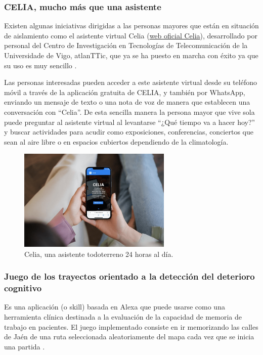 \subsubsection{CELIA, mucho más que una asistente}

Existen algunas iniciativas dirigidas a las personas mayores que están en situación de aislamiento como el asistente virtual Celia (\href{https://celiatecuida.com/}{web oficial Celia}), desarrollado por personal del Centro de Investigación en Tecnologías de Telecomunicación de la Universidade de Vigo, atlanTTic, que ya se ha puesto en marcha con éxito ya que su uso es muy sencillo \parencite{celia-app}.

Las personas interesadas pueden acceder a este asistente virtual desde su teléfono móvil a través de la aplicación gratuita de CELIA, y también por WhatsApp, enviando un mensaje de texto o una nota de voz de manera que establecen una conversación con “Celia”. De esta sencilla manera  la persona  mayor que vive sola puede preguntar al asistente virtual al levantarse “¿Qué tiempo va a hacer hoy?” y buscar actividades para acudir como exposiciones, conferencias, conciertos que sean al aire libre o en espacios cubiertos dependiendo de la climatología. 

\begin{figure}[ht]
    \centering
    \includegraphics[width=0.65\textwidth]{imgs/celia.jpg}
    \caption{Celia, una asistente todoterreno 24 horas al día.}
    \label{fig:celia}
\end{figure}

\subsubsection{Juego de los trayectos orientado a la detección del deterioro cognitivo}

Es una aplicación (o skill) basada en Alexa que puede usarse como una herramienta clínica destinada a la evaluación de la capacidad de memoria de trabajo en pacientes. El juego implementado consiste en ir memorizando las calles de Jaén de una ruta seleccionada aleatoriamente del mapa cada vez que se inicia una partida \parencite{tfgAlexa3}.

